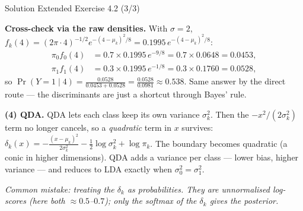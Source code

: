 \documentclass[aspectratio=169,11pt]{beamer}
\begin{document}
\begin{frame}{Solution \textemdash{} Extended Exercise 4.2 (3/3)}
\begin{solutionbox}
\textbf{Cross-check via the raw densities.} With $\sigma=2$,
$f_k(4)=(2\pi\cdot 4)^{-1/2}e^{-(4-\mu_k)^2/8}=0.1995\,e^{-(4-\mu_k)^2/8}$:
\[
\begin{aligned}
  \pi_0 f_0(4)&=0.7\times 0.1995\,e^{-9/8}=0.7\times 0.0648=0.0453,\\
  \pi_1 f_1(4)&=0.3\times 0.1995\,e^{-1/8}=0.3\times 0.1760=0.0528,
\end{aligned}
\]
so $\Pr(Y=1\mid 4)=\frac{0.0528}{0.0453+0.0528}
=\frac{0.0528}{0.0981}\approx 0.538$. \checkmark\;
Same answer by the direct route --- the discriminants are just a
shortcut through Bayes' rule.

\vspace{1mm}
\textbf{(4) QDA.} QDA lets each class keep its own variance
$\sigma_k^2$. Then the $-x^2/(2\sigma_k^2)$ term no longer cancels, so a
\emph{quadratic} term in $x$ survives:
$\delta_k(x)=-\tfrac{(x-\mu_k)^2}{2\sigma_k^2}-\tfrac12\log\sigma_k^2+\log\pi_k$.
The boundary becomes quadratic (a conic in higher dimensions). QDA adds a
variance per class --- lower bias, higher variance --- and reduces to LDA
exactly when $\sigma_0^2=\sigma_1^2$.

\vspace{1mm}
\emph{Common mistake: treating the $\delta_k$ as probabilities. They
are unnormalised log-scores (here both $\approx 0.5$--$0.7$); only the
softmax of the $\delta_k$ gives the posterior.}
\end{solutionbox}
\end{frame}
\end{document}
